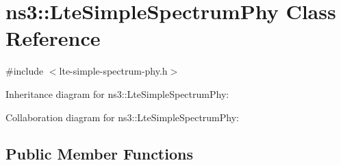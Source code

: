\hypertarget{classns3_1_1LteSimpleSpectrumPhy}{}\section{ns3\+:\+:Lte\+Simple\+Spectrum\+Phy Class Reference}
\label{classns3_1_1LteSimpleSpectrumPhy}


{\ttfamily \#include $<$lte-\/simple-\/spectrum-\/phy.\+h$>$}



Inheritance diagram for ns3\+:\+:Lte\+Simple\+Spectrum\+Phy\+:


Collaboration diagram for ns3\+:\+:Lte\+Simple\+Spectrum\+Phy\+:
\subsection*{Public Member Functions}
